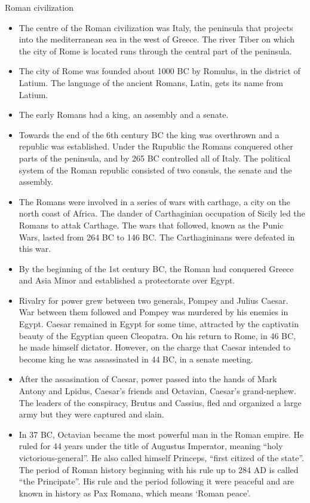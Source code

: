 \documentclass[
  openany]{book}
\providecommand{\tightlist}{%
  \setlength{\itemsep}{0pt}\setlength{\parskip}{0pt}}
\begin{document}
Roman civilization

\begin{itemize}
\tightlist
\item
  The centre of the Roman civilization was Italy, the peninsula that projects into the mediterranean sea in the west of Greece. The river Tiber on which the city of Rome is located runs through the central part of the peninsula.
\item
  The city of Rome was founded about 1000 BC by Romulus, in the district of Latium. The language of the ancient Romans, Latin, gets its name from Latium.
\item
  The early Romans had a king, an assembly and a senate.
\item
  Towards the end of the 6th century BC the king was overthrown and a republic was established. Under the Rupublic the Romans conquered other parts of the peninsula, and by 265 BC controlled all of Italy. The political system of the Roman republic consisted of two consuls, the senate and the assembly.
\item
  The Romans were involved in a series of wars with carthage, a city on the north coast of Africa. The dander of Carthaginian occupation of Sicily led the Romans to attak Carthage. The wars that followed, known as the Punic Wars, lasted from 264 BC to 146 BC. The Carthagininans were defeated in this war.
\item
  By the beginning of the 1st century BC, the Roman had conquered Greece and Asia Minor and established a protectorate over Egypt.
\item
  Rivalry for power grew between two generals, Pompey and Julius Caesar. War between them followed and Pompey was murdered by his enemies in Egypt. Caesar remained in Egypt for some time, attracted by the captivatin beauty of the Egyptian queen Cleopatra. On his return to Rome, in 46 BC, he made himself dictator. However, on the charge that Caesar intended to become king he was assassinated in 44 BC, in a senate meeting.
\item
  After the assasination of Caesar, power passed into the hands of Mark Antony and Lpidus, Caesar's friends and Octavian, Caesar's grand-nephew. The leaders of the conspiracy, Brutus and Cassius, fled and organized a large army but they were captured and slain.
\item
  In 37 BC, Octavian became the most powerful man in the Roman empire. He ruled for 44 years under the title of Augustus Imperator, meaning ``holy victorious-general''. He also called himself Princeps, ``first citized of the state''. The period of Roman history beginning with his rule up to 284 AD is called ``the Principate''. His rule and the period following it were peaceful and are known in history as Pax Romana, which means `Roman peace'.

\end{itemize}
\end{document}
